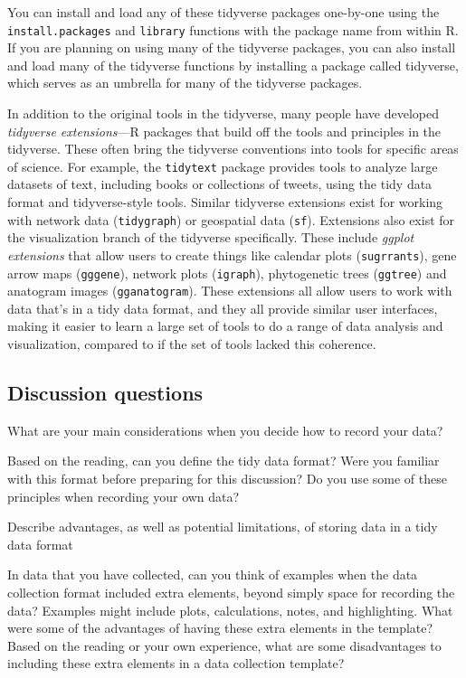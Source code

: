 \documentclass[]{tufte-book}
\begin{document}
You can install and load any of these tidyverse packages one-by-one using the
\texttt{install.packages} and \texttt{library} functions with the package name from within R.
If you are planning on using many of the tidyverse packages, you can also
install and load many of the tidyverse functions by installing a package called
tidyverse, which serves as an umbrella for many of the tidyverse packages.

In addition to the original tools in the tidyverse, many people have developed
\emph{tidyverse extensions}---R packages that build off the tools and principles in
the tidyverse. These often bring the tidyverse conventions into tools for
specific areas of science. For example, the \texttt{tidytext} package provides tools to
analyze large datasets of text, including books or collections of tweets, using
the tidy data format and tidyverse-style tools. Similar tidyverse extensions
exist for working with network data (\texttt{tidygraph}) or geospatial data (\texttt{sf}).
Extensions also exist for the visualization branch of the tidyverse
specifically. These include \emph{ggplot extensions} that allow users to create
things like calendar plots (\texttt{sugrrants}), gene arrow maps (\texttt{gggene}), network
plots (\texttt{igraph}), phytogenetic trees (\texttt{ggtree}) and anatogram images
(\texttt{gganatogram}). These extensions all allow users to work with data that's in a
tidy data format, and they all provide similar user interfaces, making it
easier to learn a large set of tools to do a range of data analysis and
visualization, compared to if the set of tools lacked this coherence.

\subsection{Discussion questions}\label{discussion-questions}

What are your main considerations when you decide how to record your data?

Based on the reading, can you define the tidy data format? Were you familiar with this format before preparing for this discussion? Do you use some of these principles when recording your own data?

Describe advantages, as well as potential limitations, of storing data in a tidy data format

In data that you have collected, can you think of examples when the data collection format included extra elements, beyond simply space for recording the data? Examples might include plots, calculations, notes, and highlighting. What were some of the advantages of having these extra elements in the template? Based on the reading or your own experience, what are some disadvantages to including these extra elements in a data collection template?
\end{document}
